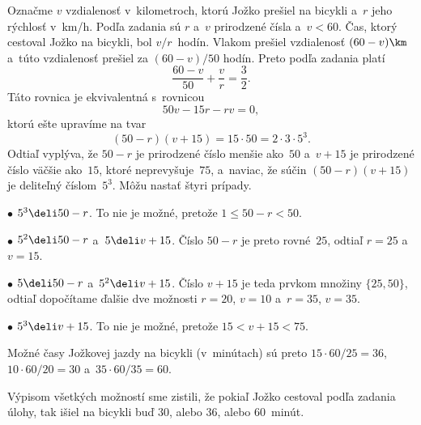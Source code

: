 {%
Označme $v$ vzdialenosť v~kilometroch, ktorú Jožko prešiel na
bicykli a~$r$ jeho rýchlosť v~km/h. Podľa zadania sú $r$
a~$v$ prirodzené čísla a~$v<60$. Čas, ktorý cestoval Jožko na bicykli, bol
$v/r$~hodín. Vlakom prešiel vzdialenosť $(60-v)\km$
a~túto vzdialenosť prešiel za $(60-v)/50$ hodín. Preto podľa
zadania platí
$$
\frac{60-v}{50}+\frac{v}{r}=\frac32.
$$
Táto rovnica je ekvivalentná s~rovnicou
$$
50v-15r-rv=0,
$$
ktorú ešte upravíme na tvar
$$
(50-r)(v+15)=15\cdot50=2\cdot3\cdot5^3.
$$
Odtiaľ vyplýva, že $50-r$ je prirodzené číslo menšie ako~$50$ a~$v+15$ je prirodzené číslo
väčšie ako~$15$, ktoré neprevyšuje~$75$, a~naviac, že súčin $(50-r)(v+15)$
je deliteľný číslom~$5^3$. Môžu nastať štyri prípady.

\item{$\bullet$} $5^3\deli 50-r$. To nie je možné, pretože $1\leq50-r<50$.
\item{$\bullet$} $5^2\deli 50-r$ a~$5\deli v+15$. Číslo $50-r$ je preto
                 rovné~$25$, odtiaľ $r=25$ a~$v=15$.
\item{$\bullet$} $5\deli 50-r$ a~$5^2\deli v+15$. Číslo $v+15$ je
                 teda prvkom množiny $\{25,50\}$, odtiaľ dopočítame
                 ďalšie dve možnosti $r=20$, $v=10$ a~$r=35$, $v=35$.
\item{$\bullet$} $5^3\deli v+15$. To nie je možné, pretože $15<v+15<75$.

Možné časy Jožkovej jazdy na bicykli (v~minútach) sú preto
$15\cdot60/25=36$, ${10\cdot60/20}=30$ a~$35\cdot60/35=60$.

Výpisom všetkých možností sme zistili, že pokiaľ Jožko cestoval
podľa zadania úlohy, tak išiel na bicykli buď $30$, alebo $36$, alebo
$60$~minút.}

